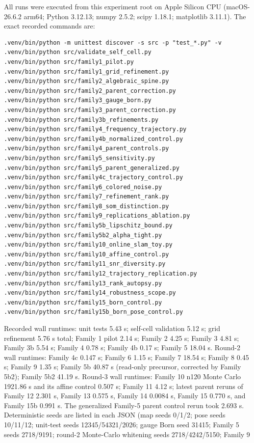 \documentclass[12pt]{article}
\begin{document}
All runs were executed from this experiment root on Apple Silicon CPU
(macOS-26.6.2 arm64; Python 3.12.13; numpy 2.5.2; scipy 1.18.1; matplotlib
3.11.1). The exact recorded commands are:
\begin{verbatim}
.venv/bin/python -m unittest discover -s src -p "test_*.py" -v
.venv/bin/python src/validate_self_cell.py
.venv/bin/python src/family1_pilot.py
.venv/bin/python src/family1_grid_refinement.py
.venv/bin/python src/family2_algebraic_spine.py
.venv/bin/python src/family2_parent_correction.py
.venv/bin/python src/family3_gauge_born.py
.venv/bin/python src/family3_parent_correction.py
.venv/bin/python src/family3b_refinements.py
.venv/bin/python src/family4_frequency_trajectory.py
.venv/bin/python src/family4b_normalized_control.py
.venv/bin/python src/family4_parent_controls.py
.venv/bin/python src/family5_sensitivity.py
.venv/bin/python src/family5_parent_generalized.py
.venv/bin/python src/family4c_trajectory_control.py
.venv/bin/python src/family6_colored_noise.py
.venv/bin/python src/family7_refinement_rank.py
.venv/bin/python src/family8_som_distinction.py
.venv/bin/python src/family9_replications_ablation.py
.venv/bin/python src/family5b_lipschitz_bound.py
.venv/bin/python src/family5b2_alpha_tight.py
.venv/bin/python src/family10_online_slam_toy.py
.venv/bin/python src/family10_affine_control.py
.venv/bin/python src/family11_snr_diversity.py
.venv/bin/python src/family12_trajectory_replication.py
.venv/bin/python src/family13_rank_autopsy.py
.venv/bin/python src/family14_robustness_scope.py
.venv/bin/python src/family15_born_control.py
.venv/bin/python src/family15b_born_pose_control.py
\end{verbatim}
Recorded wall runtimes: unit tests 5.43 s; self-cell validation 5.12 s;
grid refinement 5.76 s total; Family 1 pilot 2.14 s; Family 2 4.25 s; Family 3
4.81 s; Family 3b 5.54 s; Family 4 0.78 s; Family 4b 0.17 s; Family 5 18.04 s.
Round-2 wall runtimes: Family 4c 0.147 s; Family 6 1.15 s; Family 7 18.54 s;
Family 8 0.45 s; Family 9 1.35 s; Family 5b 40.87 s (read-only precursor,
corrected by Family 5b2); Family 5b2 41.19 s.
Round-3 wall runtimes: Family 10 n120 Monte Carlo 1921.86 s and its affine
control 0.507 s; Family 11 4.12 s; latest parent reruns of Family 12 2.301 s,
Family 13 0.575 s, Family 14 0.0084 s, Family 15 0.770 s, and Family 15b
0.991 s. The generalized Family-5 parent control rerun took 2.693 s.
Deterministic seeds are listed in each JSON (map seeds 0/1/2; pose seeds
10/11/12; unit-test seeds 12345/54321/2026; gauge Born seed 31415; Family 5
seeds 2718/9191; round-2 Monte-Carlo whitening seeds 2718/4242/5150; Family 9
\end{document}
